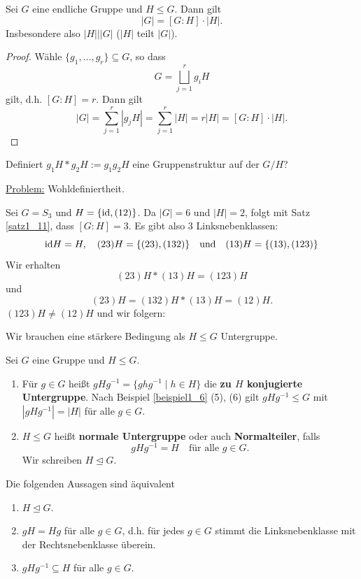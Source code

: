 \begin{satz}\label{satz1_11}
	Sei $G$ eine endliche Gruppe und $H \leq G$. Dann gilt
	\[|G| = [G : H] \cdot |H|.\]
	Insbesondere also $|H| \big| |G|$ ($|H|$ teilt $|G|$).
\end{satz}
\begin{proof}
	Wähle $\{g_1, \dots, g_r\} \subseteq G$, so dass
	\[G = \bigsqcup_{j=1}^r g_i H\]
	gilt, d.h. $[G:H] = r$. Dann gilt
	\[|G| = \sum_{j=1}^{r} |g_jH| = \sum_{j=1}^r |H| = r|H| = [G:H] \cdot |H|.\]
\end{proof}
\begin{center}
	Definiert $g_1H * g_2H := g_1g_2H$ eine Gruppenstruktur auf der $G/H$?
\end{center}
\underline{Problem:} Wohldefiniertheit.
\begin{beispiel}
	Sei $G = S_3$ und $H = \{\mathrm{id}, (12)\}$. Da $|G|= 6$ und $|H| = 2$, folgt mit Satz \ref{satz1_11}, dass $[G:H] = 3$. Es gibt also 3 Linksnebenklassen:
	\[\mathrm{id} H = H, \quad (23)H = \{(23), (132)\} \quad\text{und}\quad (13)H = \{(13), (123)\}\]
	Wir erhalten
	\[(23)H * (13)H = (123)H\]
	und
	\[(23)H = (132)H * (13)H = (12)H.\]
	$(123)H \neq (12)H$ und wir folgern:
	
	Wir brauchen eine stärkere Bedingung als $H \leq G$ Untergruppe.
\end{beispiel}
\begin{definition}
	Sei $G$ eine Gruppe und $H \leq G$. 
	\begin{enumerate}[label=(\alph*)]
		\item Für $g \in G$ heißt $gHg^{-1} = \{ghg^{-1} \mid h \in H\}$ die \textbf{zu $H$ konjugierte Untergruppe}. Nach Beispiel \ref{beispiel1_6} (5), (6) gilt $gHg^{-1} \leq G$ mit $|gHg^{-1}| = |H|$ für alle $g \in G$.
		\item $H \leq G$ heißt \textbf{normale Untergruppe} oder auch \textbf{Normalteiler}, falls 
		\[gHg^{-1} = H \quad\text{für alle } g \in G.\]
		Wir schreiben $H \unlhd G$.
	\end{enumerate}
\end{definition}
\begin{rem}\label{rem1_14}
	Die folgenden Aussagen sind äquivalent
	\begin{enumerate}[label=(\roman*)]
		\item $H \unlhd G$.
		\item $gH = Hg$ für alle $g \in G$, d.h. für jedes $g \in G$ stimmt die Linksnebenklasse mit der Rechtsnebenklasse überein.
		\item $gHg^{-1} \subseteq H$ für alle $g \in G$.
	\end{enumerate}
\end{rem}
